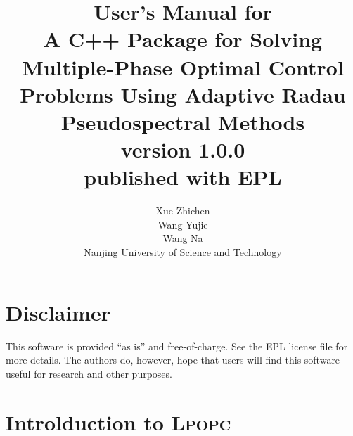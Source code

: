\documentclass[10pt]{article}
\title{{User's Manual for \LPOPC}\\A C++ Package for Solving Multiple-Phase Optimal Control Problems Using Adaptive Radau Pseudospectral Methods\\version 1.0.0\\published with EPL}
\author{Xue Zhichen \\Wang Yujie \\Wang Na
\\Nanjing University of Science and Technology
}
\newcommand{\LPOPC}{\textsc{Lpopc}\xspace}
\begin{document}
\maketitle
\thispagestyle{empty}

\clearpage
\section*{Disclaimer}

This software is provided ``as is'' and free-of-charge.  See the EPL license file for more details.  The authors do, however,
hope that users will find this software useful for research and other
purposes.
\thispagestyle{empty}
\clearpage
\tableofcontents
\thispagestyle{empty}
\clearpage
\setcounter{page}{1}
\section{Introlduction to \LPOPC}
\end{document}
